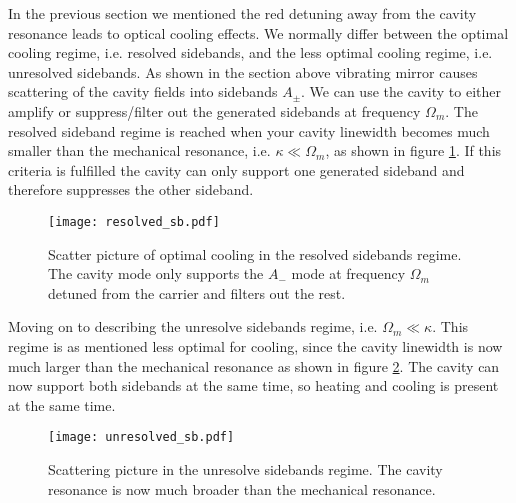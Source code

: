 In the previous section we mentioned the red detuning away from the cavity resonance leads to optical cooling effects. We normally differ between the optimal cooling regime, i.e. resolved sidebands, and the less optimal cooling regime, i.e. unresolved sidebands. As shown in the section above vibrating mirror causes scattering of the cavity fields into sidebands $A_{\pm}$. We can use the cavity to either amplify or suppress/filter out the generated sidebands at frequency $\Omega_m$. The resolved sideband regime is reached when your cavity linewidth becomes much smaller than the mechanical resonance, i.e. $\kappa \ll \Omega_m$, as shown in figure \ref{fig:resolved_sb}. If this criteria is fulfilled the cavity can only support one generated sideband and therefore suppresses the other sideband.

\begin{figure}[H]
\centering
\texttt{[image: resolved\_sb.pdf]}
\caption{Scatter picture of optimal cooling in the resolved sidebands regime. The cavity mode only supports the $A_-$ mode at frequency $\Omega_m$ detuned from the carrier and filters out the rest.}
\label{fig:resolved_sb}
\end{figure}

Moving on to describing the unresolve sidebands regime, i.e. $\Omega_m \ll \kappa$. This regime is as mentioned less optimal for cooling, since the cavity linewidth is now much larger than the mechanical resonance as shown in figure \ref{fig:unresolved_sb}. The cavity can now support both sidebands at the same time, so heating and cooling is present at the same time.

\begin{figure}[H]
\centering
\texttt{[image: unresolved\_sb.pdf]}
\caption{Scattering picture in the unresolve sidebands regime. The cavity resonance is now much broader than the mechanical resonance.}
\label{fig:unresolved_sb}
\end{figure}